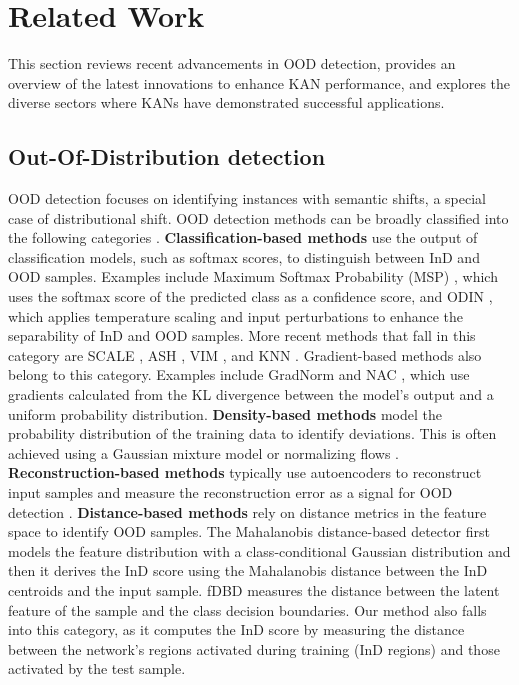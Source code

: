 \section{Related Work}
This section reviews recent advancements in OOD detection, provides an overview of the latest innovations to enhance KAN performance, and explores the diverse sectors where KANs have demonstrated successful applications.

\subsection{Out-Of-Distribution detection}
OOD detection focuses on identifying instances with semantic shifts, a special case of distributional shift.  
OOD detection methods can be broadly classified into the following categories \citep{yang2024generalizedoutofdistributiondetectionsurvey}. 
\textbf{Classification-based methods} use the output of classification models, such as softmax scores, to distinguish between InD and OOD samples. Examples include Maximum Softmax Probability (MSP) \citep{hendrycks2017a}, which uses the softmax score of the predicted class as a confidence score, and ODIN \citep{liang2018enhancing}, which applies temperature scaling and input perturbations to enhance the separability of InD and OOD samples. 
More recent methods that fall in this category are SCALE \citep{xu2024scaling}, ASH \citep{djurisic2023extremely}, VIM \citep{haoqi2022vim}, and KNN \citep{sun2022knnood}. 
Gradient-based methods also belong to this category. 
Examples include GradNorm \citep{huang2021importance} and NAC \citep{liu2024neuron}, which use gradients calculated from the KL divergence between the model's output and a uniform probability distribution.
\textbf{Density-based methods} model the probability distribution of the training data to identify deviations. 
This is often achieved using a Gaussian mixture model \citep{zong2018deep} or normalizing flows \citep{zisselman2020deepresidualflowdistribution, jiang2022revisiting}.
\textbf{Reconstruction-based methods} typically use autoencoders to reconstruct input samples and measure the reconstruction error as a signal for OOD detection \citep{jiang2023readaggregatingreconstructionerror, 9878470}.
\textbf{Distance-based methods} rely on distance metrics in the feature space to identify OOD samples. 
The Mahalanobis distance-based detector \citep{NEURIPS2018_abdeb6f5} first models the feature distribution with a class-conditional Gaussian distribution and then it derives the InD score using the Mahalanobis distance between the InD centroids and the input sample. 
fDBD \citep{liu2024fast} measures the distance between the latent feature of the sample and the class decision boundaries. 
Our method also falls into this category, as it computes the InD score by measuring the distance between the network's regions activated during training (InD regions) and those activated by the test sample.


